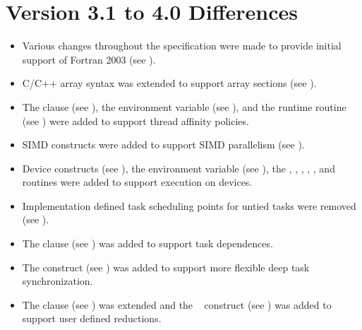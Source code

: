 \section{Version 3.1 to 4.0 Differences}
\label{sec:Version 3.1 to 4.0 Differences}
\begin{itemize}
\item Various changes throughout the specification were made to provide initial support of
Fortran 2003 (see
).

\item C/C++ array syntax was extended to support array sections (see
).

\item The  clause (see
),
the 
environment variable (see
), and the 
runtime routine (see
)
were added to support thread
affinity policies.

\item SIMD constructs were added to support SIMD parallelism (see
).

\item Device constructs (see
),
the 
environment variable (see
), the
, ,
, , , and
 routines were added to support execution on devices.

\item Implementation defined task scheduling points for untied tasks were removed (see
).

\item The  clause (see
)
was added to support task dependences.

\item The  construct (see
) was added to support
more flexible deep task synchronization.

\item The  clause (see
) was extended and the
~ construct (see
) was added to
support user defined reductions.


\end{itemize}
